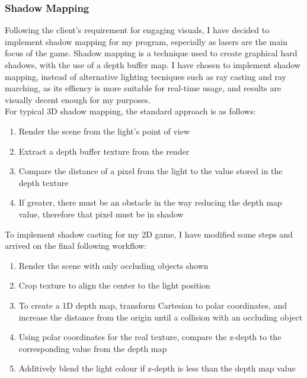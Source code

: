 \documentclass[../main/main.tex]{subfiles}
\begin{document}
\subsubsection{Shadow Mapping}
Following the client's requirement for engaging visuals, I have decided to implement shadow mapping for my program, especially as lasers are the main focus of the game. Shadow mapping is a technique used to create graphical hard shadows, with the use of a depth buffer map. I have chosen to implement shadow mapping, instead of alternative lighting tecniques such as ray casting and ray marching, as its effiency is more suitable for real-time usage, and results are visually decent enough for my purposes.
\\
For typical 3D shadow mapping, the standard approach is as follows:

\begin{enumerate}
\item Render the scene from the light's point of view
\item Extract a depth buffer texture from the render
\item Compare the distance of a pixel from the light to the value stored in the depth texture
\item If greater, there must be an obstacle in the way reducing the depth map value, therefore that pixel must be in shadow
\end{enumerate}

\noindent To implement shadow casting for my 2D game, I have modified some steps and arrived on the final following workflow:

\begin{enumerate}
\item Render the scene with only occluding objects shown
\item Crop texture to align the center to the light position
\item To create a 1D depth map, transform Cartesian to polar coordinates, and increase the distance from the origin until a collision with an occluding object
\item Using polar coordinates for the real texture, compare the z-depth to the corresponding value from the depth map
\item Additively blend the light colour if z-depth is less than the depth map value
\end{enumerate}
\end{document}
